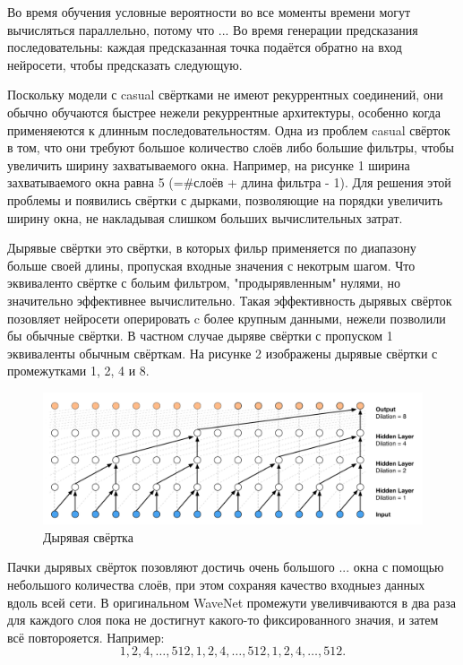 \documentclass[../diploma.tex]{subfiles}
\begin{document}
Во время обучения условные вероятности во все моменты времени могут вычисляться параллельно, потому что ... Во время генерации предсказания последовательны: каждая предсказанная точка подаётся обратно на вход нейросети, чтобы предсказать следующую.

Поскольку модели с casual свёртками не имеют рекуррентных соединений, они обычно обучаются быстрее нежели рекуррентные архитектуры, особенно когда применяеются к длинным последовательностям. Одна из проблем casual свёрток в том, что они требуют большое количество слоёв либо большие фильтры, чтобы увеличить ширину захватываемого окна. Например, на рисунке 1 ширина захватываемого окна равна 5 (=\#слоёв + длина фильтра - 1). Для решения этой проблемы и появились свёртки с дырками, позволяющие на порядки увеличить ширину окна, не накладывая слишком больших вычислительных затрат. 

Дырявые свёртки это свёртки, в которых фильр применяется по диапазону больше своей длины, пропуская входные значения с некотрым шагом. Что эквиваленто свёртке с больим фильтром, "продырявленным" нулями, но значительно эффективнее вычислительно. Такая эффективность дырявых свёрток позовляет нейросети оперировать c более крупным данными, нежели позволили бы обычные свёртки. В частном случае дыряве свёртки с пропуском 1 эквиваленты обычным свёрткам. На рисунке 2 изображены дырявые свёртки с промежутками 1, 2, 4 и 8. 

\begin{figure}[h!]
  \includegraphics[scale=0.3]{img/casual_dilated}
  \caption{Дырявая свёртка}
  \label{fig:casual_dilated}
\end{figure}

Пачки дырявых свёрток позовляют достичь очень большого ... окна с помощью небольшого количества слоёв, при этом сохраняя качество входныез данных вдоль всей сети. В оригинальном WaveNet промежути увеливчиваются в два раза для каждого слоя пока не достигнут какого-то фиксированного значия, и затем всё повторояется. Например:
$$1,2,4,\dots, 512, 1,2,4,\dots, 512, 1,2,4,\dots, 512.$$ 
\end{document}
